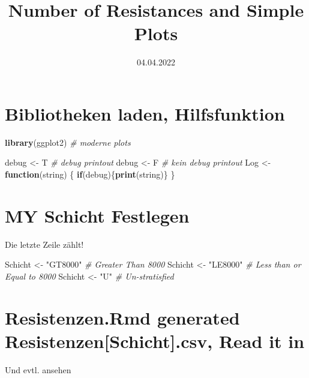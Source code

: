 \documentclass[
]{article}
\title{Number of Resistances and Simple Plots}
\author{}
\date{\vspace{-2.5em}04.04.2022}
\newenvironment{Shaded}{\begin{snugshade}}{\end{snugshade}}
\newcommand{\CommentTok}[1]{\textcolor[rgb]{0.56,0.35,0.01}{\textit{#1}}}
\newcommand{\ControlFlowTok}[1]{\textcolor[rgb]{0.13,0.29,0.53}{\textbf{#1}}}
\newcommand{\KeywordTok}[1]{\textcolor[rgb]{0.13,0.29,0.53}{\textbf{#1}}}
\newcommand{\NormalTok}[1]{#1}
\newcommand{\StringTok}[1]{\textcolor[rgb]{0.31,0.60,0.02}{#1}}
\begin{document}
\maketitle

\hypertarget{bibliotheken-laden-hilfsfunktion}{%
\section{Bibliotheken laden,
Hilfsfunktion}\label{bibliotheken-laden-hilfsfunktion}}

\begin{Shaded}
\begin{Highlighting}[]
\KeywordTok{library}\NormalTok{(ggplot2)     }\CommentTok{# moderne plots}

\NormalTok{debug <-}\StringTok{ }\NormalTok{T           }\CommentTok{# debug printout}
\NormalTok{debug <-}\StringTok{ }\NormalTok{F           }\CommentTok{# kein debug printout}
\NormalTok{Log <-}\StringTok{ }\ControlFlowTok{function}\NormalTok{(string) \{}
  \ControlFlowTok{if}\NormalTok{(debug)\{}\KeywordTok{print}\NormalTok{(string)\}  }
\NormalTok{\}}
\end{Highlighting}
\end{Shaded}

\hypertarget{my-schicht-festlegen}{%
\section{MY Schicht Festlegen}\label{my-schicht-festlegen}}

Die letzte Zeile zählt!

\begin{Shaded}
\begin{Highlighting}[]
\NormalTok{Schicht <-}\StringTok{ "GT8000"}    \CommentTok{# Greater Than 8000}
\NormalTok{Schicht <-}\StringTok{ "LE8000"}    \CommentTok{# Less than or Equal to 8000}
\NormalTok{Schicht <-}\StringTok{ "U"}         \CommentTok{# Un-stratisfied}
\end{Highlighting}
\end{Shaded}

\hypertarget{resistenzen.rmd-generated-resistenzenschicht.csv-read-it-in}{%
\section{Resistenzen.Rmd generated Resistenzen{[}Schicht{]}.csv, Read it
in}\label{resistenzen.rmd-generated-resistenzenschicht.csv-read-it-in}}

Und evtl. ansehen
\end{document}
